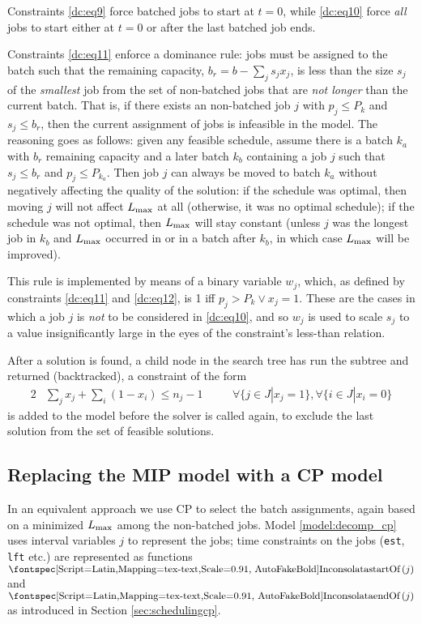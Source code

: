 \documentclass[13pt, letterpaper, oneside]{book}
\begin{document}
Constraints \eqref{dc:eq9} force batched jobs to start at $t = 0$, while
\eqref{dc:eq10} force \textit{all} jobs to start either at $t = 0$ or after the
last batched job ends.

Constraints \eqref{dc:eq11} enforce a dominance rule: jobs must be assigned to
the batch such that the remaining capacity, $b_r = b - \sum_j s_j x_j$, is less
than the size $s_j$ of the \textit{smallest} job from the set of non-batched
jobs that are \textit{not longer} than the current batch. That is, if there
exists an non-batched job $j$ with $p_j \leq P_k$ and $s_j \leq b_r$, then the
current assignment of jobs is infeasible in the model. The reasoning goes as
follows: given any feasible schedule, assume there is a batch $k_a$ with $b_r$
remaining capacity and a later batch $k_b$ containing a job $j$ such that $s_j
\leq b_r$ and $p_j \leq P_{k_a}$. Then job $j$ can always be moved to batch
$k_a$ without negatively affecting the quality of the solution: if the schedule
was optimal, then moving $j$ will not affect $L_{\text{max}}$ at all (otherwise, it was
no optimal schedule); if the schedule was not optimal, then $L_{\text{max}}$ will stay
constant (unless $j$ was the longest job in $k_b$ and $L_{\text{max}}$ occurred in or in a
batch after $k_b$, in which case $L_{\text{max}}$ will be improved).

This rule is implemented by means of a binary variable $w_j$, which, as defined
by constraints \eqref{dc:eq11} and \eqref{dc:eq12}, is 1 iff $p_j > P_k \lor x_j
= 1$. These are the cases in which a job $j$ is \textit{not} to be considered in
\eqref{dc:eq10}, and so $w_j$ is used to scale $s_j$ to a value insignificantly
large in the eyes of the constraint's less-than relation.

After a solution is found, a child node in the search tree has run the subtree
and returned (backtracked), a constraint of the form 
\begin{alignat}{2}
& \sum_j x_j + \sum_i (1-x_i) \leq n_j - 1 \quad && \forall \{j \in J | x_j =
1\}, \forall \{i \in J | x_i = 0 \}
\end{alignat}
is added to the model before the solver is called again, to exclude the last
solution from the set of feasible solutions. 

\subsection{Replacing the MIP model with a CP model}\label{sec:cpdecomp}
In an equivalent approach we use CP to select the batch assignments,
again based on a minimized $L_{\text{max}}$ among the non-batched jobs. Model
\ref{model:decomp_cp} uses interval variables $j$ to represent the jobs;
time constraints on the jobs (\texttt{est}, \texttt{lft} etc.) are represented as
functions $\startOf(j)$ and $\endOf(j)$ as introduced in Section
\ref{sec:schedulingcp}.
\end{document}
